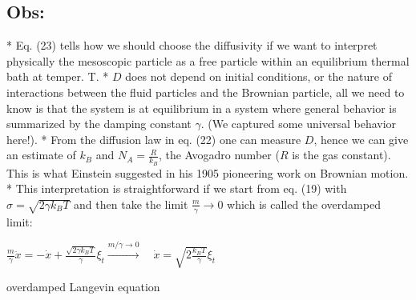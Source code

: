 \subsection*{Obs:}
    * Eq. (23) tells how we should choose the diffusivity if we want to interpret physically the mesoscopic particle as a free particle within an equilibrium thermal bath at temper. T.
    * $D$ does not depend on initial conditions, or the nature of interactions between the fluid particles and the Brownian particle, all we need to know is that the system is at equilibrium in a system where general behavior is summarized by the damping constant $\gamma$. (We captured some universal behavior here!).
    * From the diffusion law in eq. (22) one can measure $D$, hence we can give an estimate of $k_{B}$ and $N_{A}=\frac{R}{k_{B}}$, the Avogadro number ($R$ is the gas constant). This is what Einstein suggested in his 1905 pioneering work on Brownian motion.
    * This interpretation is straightforward if we start from eq. (19) with $\sigma=\sqrt{2 \gamma k_{B} T}$ and then take the limit $\frac{m}{\gamma} \rightarrow 0$ which is called the overdamped limit:
\begin{DispWithArrows}
    $\frac{m}{\gamma} \ddot{x}=-\dot{x}+\frac{\sqrt{2 \gamma k_{B} T}}{\gamma} \xi_{t} \xrightarrow{m / \gamma \rightarrow 0} \quad \dot{x}=\sqrt{2 \frac{k_{B} T}{\gamma}} \xi_{t}$
\end{DispWithArrows}
overdamped Langevin equation

